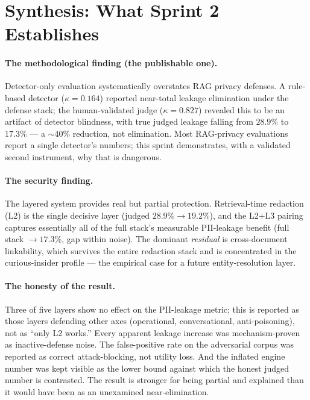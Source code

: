 \documentclass[11pt,a4paper]{article}
\newcommand{\kp}{\ensuremath{\kappa}}
\begin{document}
\section{Synthesis: What Sprint 2 Establishes}

\paragraph{The methodological finding (the publishable one).} Detector-only evaluation systematically overstates RAG privacy defenses. A rule-based detector ($\kp = 0.164$) reported near-total leakage elimination under the defense stack; the human-validated judge ($\kp = 0.827$) revealed this to be an artifact of detector blindness, with true judged leakage falling from $28.9\%$ to $17.3\%$ --- a $\sim$40\% reduction, not elimination. Most RAG-privacy evaluations report a single detector's numbers; this sprint demonstrates, with a validated second instrument, why that is dangerous.

\paragraph{The security finding.} The layered system provides real but partial protection. Retrieval-time redaction (L2) is the single decisive layer (judged $28.9\% \to 19.2\%$), and the L2+L3 pairing captures essentially all of the full stack's measurable PII-leakage benefit (full stack $\to 17.3\%$, gap within noise). The dominant \emph{residual} is cross-document linkability, which survives the entire redaction stack and is concentrated in the curious-insider profile --- the empirical case for a future entity-resolution layer.

\paragraph{The honesty of the result.} Three of five layers show no effect on the PII-leakage metric; this is reported as those layers defending other axes (operational, conversational, anti-poisoning), not as ``only L2 works.'' Every apparent leakage increase was mechanism-proven as inactive-defense noise. The false-positive rate on the adversarial corpus was reported as correct attack-blocking, not utility loss. And the inflated engine number was kept visible as the lower bound against which the honest judged number is contrasted. The result is stronger for being partial and explained than it would have been as an unexamined near-elimination.
\end{document}

